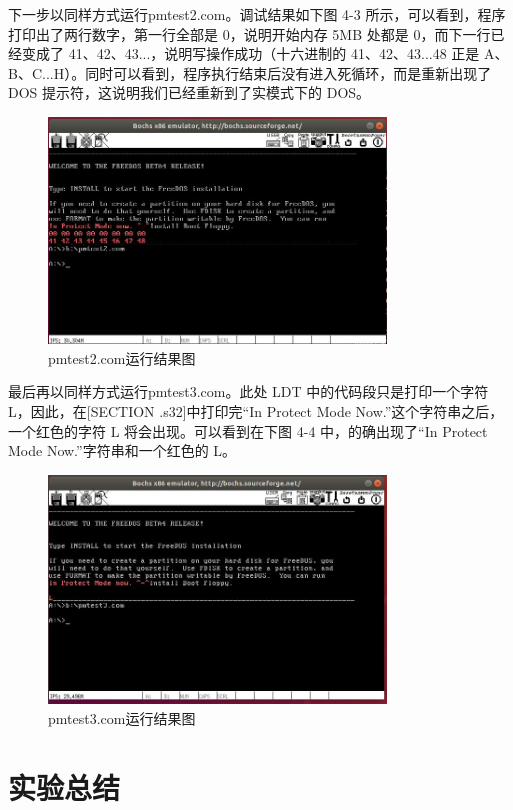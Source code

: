 下一步以同样方式运行pmtest2.com。调试结果如下图 4-3 所示，可以看到，程序打印出了两行数字，第一行全部是 0，说明开始内存 5MB 处都是 0，而下一行已经变成了 41、42、43...，说明写操作成功（十六进制的 41、42、43...48 正是 A、B、C...H）。同时可以看到，程序执行结束后没有进入死循环，而是重新出现了 DOS 提示符，这说明我们已经重新到了实模式下的 DOS。
\begin{figure}[H]
  \centering
  \includegraphics[width=0.8\textwidth]{figures/chapter4/4-3.jpg}
  \caption{pmtest2.com运行结果图}
  \label{fig:3}
\end{figure}

最后再以同样方式运行pmtest3.com。此处 LDT 中的代码段只是打印一个字符 L，因此，在[SECTION .s32]中打印完“In Protect Mode Now.”这个字符串之后，一个红色的字符 L 将会出现。可以看到在下图 4-4 中，的确出现了“In Protect Mode Now.”字符串和一个红色的 L。
\begin{figure}[H]
  \centering
  \includegraphics[width=0.8\textwidth]{figures/chapter4/4-4.jpg}
  \caption{pmtest3.com运行结果图}
  \label{fig:4}
\end{figure}

\section{实验总结}

